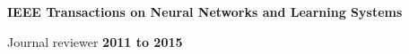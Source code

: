 \textbf{IEEE Transactions on Neural Networks and Learning Systems}
\begin{outerlist}
\item[] Journal reviewer \hfill \textbf{2011 to 2015}
\end{outerlist}
